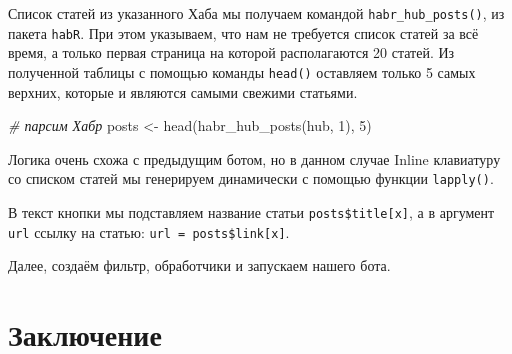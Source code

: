 \documentclass[
]{book}
\newenvironment{Shaded}{\begin{snugshade}}{\end{snugshade}}
\newcommand{\AttributeTok}[1]{\textcolor[rgb]{0.77,0.63,0.00}{#1}}
\newcommand{\CommentTok}[1]{\textcolor[rgb]{0.56,0.35,0.01}{\textit{#1}}}
\newcommand{\ControlFlowTok}[1]{\textcolor[rgb]{0.13,0.29,0.53}{\textbf{#1}}}
\newcommand{\DecValTok}[1]{\textcolor[rgb]{0.00,0.00,0.81}{#1}}
\newcommand{\FunctionTok}[1]{\textcolor[rgb]{0.00,0.00,0.00}{#1}}
\newcommand{\NormalTok}[1]{#1}
\newcommand{\OtherTok}[1]{\textcolor[rgb]{0.56,0.35,0.01}{#1}}
\newcommand{\SpecialCharTok}[1]{\textcolor[rgb]{0.00,0.00,0.00}{#1}}
\begin{document}
Список статей из указанного Хаба мы получаем командой \texttt{habr\_hub\_posts()}, из пакета \texttt{habR}. При этом указываем, что нам не требуется список статей за всё время, а только первая страница на которой располагаются 20 статей. Из полученной таблицы с помощью команды \texttt{head()} оставляем только 5 самых верхних, которые и являются самыми свежими статьями.

\begin{Shaded}
\begin{Highlighting}[]
  \CommentTok{\# парсим Хабр}
\NormalTok{  posts }\OtherTok{\textless{}{-}} \FunctionTok{head}\NormalTok{(}\FunctionTok{habr\_hub\_posts}\NormalTok{(hub, }\DecValTok{1}\NormalTok{), }\DecValTok{5}\NormalTok{)}
\end{Highlighting}
\end{Shaded}

Логика очень схожа с предыдущим ботом, но в данном случае Inline клавиатуру со списком статей мы генерируем динамически с помощью функции \texttt{lapply()}.

\begin{Shaded}
\end{Shaded}

В текст кнопки мы подставляем название статьи \texttt{posts\$title{[}x{]}}, а в аргумент \texttt{url} ссылку на статью: \texttt{url\ =\ posts\$link{[}x{]}}.

Далее, создаём фильтр, обработчики и запускаем нашего бота.

\hypertarget{ux437ux430ux43aux43bux44eux447ux435ux43dux438ux435-2}{%
\section{Заключение}\label{ux437ux430ux43aux43bux44eux447ux435ux43dux438ux435-2}}
\end{document}
